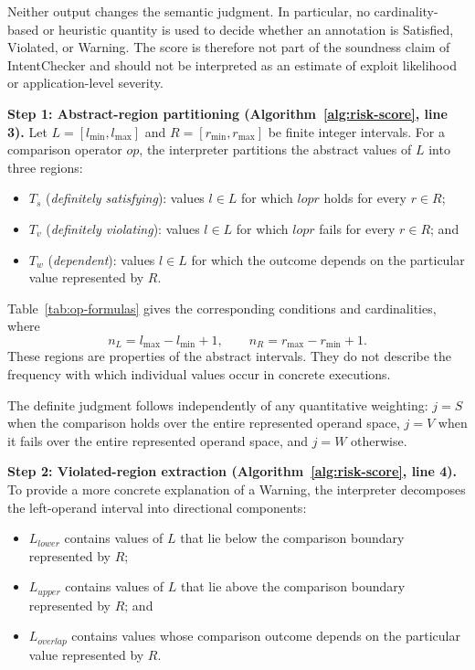 \documentclass[pdflatex,sn-basic]{sn-jnl}%
\theoremstyle{thmstyleone}%
\theoremstyle{thmstyletwo}%
\theoremstyle{thmstylethree}%
\begin{document}
Neither output changes the semantic judgment.
In particular, no cardinality-based or heuristic quantity is used to decide
whether an annotation is Satisfied, Violated, or Warning.
The score is therefore not part of the soundness claim of IntentChecker and
should not be interpreted as an estimate of exploit likelihood or
application-level severity.


\smallskip
\noindent\textbf{Step 1: Abstract-region partitioning
(Algorithm~\ref{alg:risk-score}, line 3).}
Let $L=[l_{\min},l_{\max}]$ and $R=[r_{\min},r_{\max}]$ be finite integer
intervals.
For a comparison operator $op$, the interpreter partitions the abstract values
of $L$ into three regions:
\begin{itemize}
    \item $T_s$ (\emph{definitely satisfying}):
    values $l\in L$ for which $l\mathrel{op}r$ holds for every $r\in R$;

    \item $T_v$ (\emph{definitely violating}):
    values $l\in L$ for which $l\mathrel{op}r$ fails for every $r\in R$; and

    \item $T_w$ (\emph{dependent}):
    values $l\in L$ for which the outcome depends on the particular
    value represented by $R$.
\end{itemize}

Table~\ref{tab:op-formulas} gives the corresponding conditions and
cardinalities, where
\[
n_L=l_{\max}-l_{\min}+1,
\qquad
n_R=r_{\max}-r_{\min}+1.
\]
These regions are properties of the abstract intervals.
They do not describe the frequency with which individual values occur in
concrete executions.

The definite judgment follows independently of any quantitative weighting:
$j=S$ when the comparison holds over the entire represented operand space,
$j=V$ when it fails over the entire represented operand space, and
$j=W$ otherwise.




\smallskip
\noindent\textbf{Step 2: Violated-region extraction
(Algorithm~\ref{alg:risk-score}, line 4).}
To provide a more concrete explanation of a Warning, the interpreter decomposes
the left-operand interval into directional components:
\begin{itemize}
    \item $L_{\mathit{lower}}$ contains values of $L$ that lie below the
    comparison boundary represented by $R$;

    \item $L_{\mathit{upper}}$ contains values of $L$ that lie above the
    comparison boundary represented by $R$; and

    \item $L_{\mathit{overlap}}$ contains values whose comparison outcome
    depends on the particular value represented by $R$.
\end{itemize}
\end{document}

